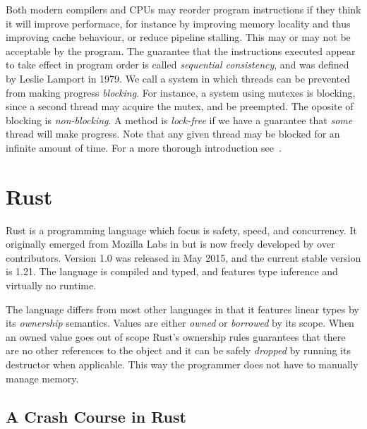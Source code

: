 \documentclass[a4paper,twoside]{report}
\begin{document}
Both modern compilers and CPUs may reorder program instructions if they think
it will improve performace, for instance by improving memory locality and thus
improving cache behaviour, or reduce pipeline stalling. This may or may not be
acceptable by the program. The guarantee that the instructions executed appear
to take effect in program order is called \emph{sequential consistency}, and
was defined by Leslie Lamport in 1979.  We call a system in
which threads can be prevented from making progress \emph{blocking}. For
instance, a system using mutexes is blocking, since a second thread may acquire
the mutex, and be preempted. The oposite of blocking is \emph{non-blocking}.  A
method is \emph{lock-free} if we have a guarantee that \emph{some} thread will
make progress.  Note that any given thread may be blocked for an infinite
amount of time.  For a more thorough introduction see~\cite{herlihy2011art}.




\section{Rust}
 Rust is a programming language which focus is safety, speed, and
concurrency.  It originally emerged from Mozilla Labs in  but is now
freely developed by over  contributors.  Version 1.0 was released
in May 2015, and the current stable version is 1.21.  The language is compiled
and typed, and features type inference and virtually no runtime.

The language differs from most other languages in that it features linear types
by its \emph{ownership} semantics.  Values are either \emph{owned} or
\emph{borrowed} by its scope.  When an owned value goes out of scope Rust's
ownership rules guarantees that there are no other references to the object and
it can be safely \emph{dropped} by running its destructor when applicable.
This way the programmer does not have to manually manage memory.

\subsection{A Crash Course in Rust}
\end{document}
